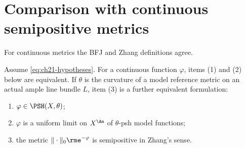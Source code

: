 \section{Comparison with continuous semipositive metrics}
\label{sec:ch21-continuous}

For continuous metrics the BFJ and Zhang definitions agree.

\begin{theorem}\label{thm:ch21-continuous-zhang}
Assume \eqref{eq:ch21-hypotheses}.  For a continuous function
$\varphi$, items (1) and (2) below are equivalent.  If $\theta$ is the
curvature of a model reference metric on an actual ample line bundle $L$,
item (3) is a further equivalent formulation:

\begin{enumerate}
\item $\varphi\in\PSH(X,\theta)$;
\item $\varphi$ is a uniform limit on $X^{\An}$ of $\theta$-psh model
functions;
\item the metric $\|\cdot\|_0\rme^{-\varphi}$ is semipositive in Zhang's
sense.
\end{enumerate}
\end{theorem}

